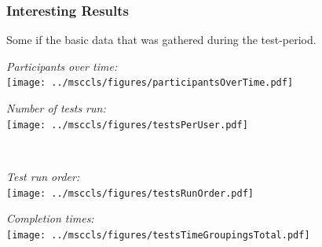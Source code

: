\documentclass[xcolor=svgnames,10pt,aspectratio=1610]{beamer}
\begin{document}
\begin{frame}
  \frametitle{Interesting Results}
  \vspace{-1.1cm}
  Some if the basic data that was gathered during the test-period. \\
  \vspace{0.3cm}
  \begin{minipage}{\textwidth}
    \begin{minipage}{0.50\textwidth}
      \vspace{-0.2cm}
      \textit{Participants over time:} \\
      \texttt{[image: ../msccls/figures/participantsOverTime.pdf]}
    \end{minipage}
    \begin{minipage}{0.50\textwidth}
      \textit{Number of tests run:} \\
      \texttt{[image: ../msccls/figures/testsPerUser.pdf]}
    \end{minipage}
  \end{minipage} \\
  \begin{minipage}{\textwidth}
    \begin{minipage}{0.50\textwidth}
      \vspace{-0.3cm}
      \textit{Test run order:} \\
      \texttt{[image: ../msccls/figures/testsRunOrder.pdf]}
    \end{minipage}
    \begin{minipage}{0.50\textwidth}
      \vspace{-0.1cm}
      \textit{Completion times:} \\
      \texttt{[image: ../msccls/figures/testsTimeGroupingsTotal.pdf]}
    \end{minipage}
  \end{minipage} \\
\end{frame}
\end{document}
